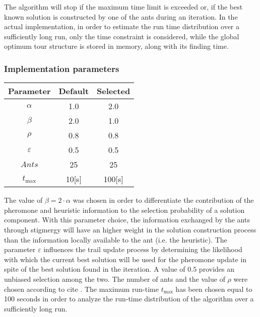 \begin{homeworkProblem}
The algorithm will stop if the maximum time limit is exceeded or, if the best known solution is constructed by one of the ants during an iteration.
In the actual implementation, in order to estimate the run time distribution over a sufficiently long run, only the time constraint is considered, while the global optimum tour structure is stored in memory, along with its finding time.

\subsubsection{Implementation parameters}
\begin{center}
\begin{tabular}{|c|c|c|}
\hline
\textbf{Parameter} & \textbf{Default} & \textbf{Selected} \\ \hline 
$\alpha$ & 1.0 & 2.0 \\\hline
$\beta$ & 2.0 & 1.0 \\\hline 
$\rho$ & 0.8 & 0.8 \\\hline 
$\varepsilon$ & 0.5 & 0.5 \\ \hline 
$Ants$ & 25 & 25 \\ \hline  
$t_{\max}$ & 10[s] & 100[s] \\ \hline
\end{tabular}
\label{saParameters}
\end{center}

The value of $\beta = 2 \cdot \alpha$ was chosen in order to differentiate the contribution of the pheromone and heuristic information to the selection probability of a solution component.
With this parameter choice, the information exchanged by the ants through stigmergy will have an higher weight in the solution construction process than the information locally available to the ant (i.e. the heuristic).
The parameter $\varepsilon$ influences the trail update process by determining the likelihood with which the current best solution will be used for the pheromone update in spite of the best solution found in the iteration.
A value of $0.5$ provides an unbiased selection among the two.
The number of ants and the value of $\rho$ were chosen according to cite \cite{stutzle2000max}.
The maximum run-time $t_{\max}$ has been chosen equal to 100 seconds in order to analyze the run-time distribution of the algorithm over a sufficiently long run.

 
\end{homeworkProblem}
